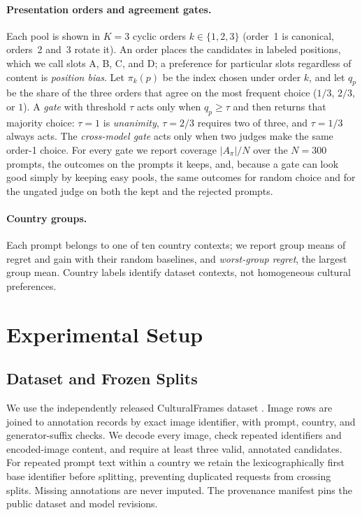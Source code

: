 \documentclass[letterpaper]{article}
\begin{document}
\paragraph{Presentation orders and agreement gates.} Each pool is shown in $K=3$ cyclic orders $k\in\{1,2,3\}$ (order~1 is canonical, orders~2 and~3 rotate it). An order places the candidates in labeled positions, which we call slots A, B, C, and D; a preference for particular slots regardless of content is \emph{position bias}. Let $\pi_k(p)$ be the index chosen under order $k$, and let $q_p$ be the share of the three orders that agree on the most frequent choice ($1/3$, $2/3$, or $1$). A \emph{gate} with threshold $\tau$ acts only when $q_p\ge\tau$ and then returns that majority choice: $\tau=1$ is \emph{unanimity}, $\tau=2/3$ requires two of three, and $\tau=1/3$ always acts. The \emph{cross-model gate} acts only when two judges make the same order-1 choice. For every gate we report coverage $|A_\pi|/N$ over the $N=300$ prompts, the outcomes on the prompts it keeps, and, because a gate can look good simply by keeping easy pools, the same outcomes for random choice and for the ungated judge on both the kept and the rejected prompts.

\paragraph{Country groups.} Each prompt belongs to one of ten country contexts; we report group means of regret and gain with their random baselines, and \emph{worst-group regret}, the largest group mean. Country labels identify dataset contexts, not homogeneous cultural preferences.

\section{Experimental Setup}
\subsection{Dataset and Frozen Splits}
We use the independently released CulturalFrames dataset \citep{culturalframes}. Image rows are joined to annotation records by exact image identifier, with prompt, country, and generator-suffix checks. We decode every image, check repeated identifiers and encoded-image content, and require at least three valid, annotated candidates. For repeated prompt text within a country we retain the lexicographically first base identifier before splitting, preventing duplicated requests from crossing splits. Missing annotations are never imputed. The provenance manifest pins the public dataset and model revisions.
\end{document}
